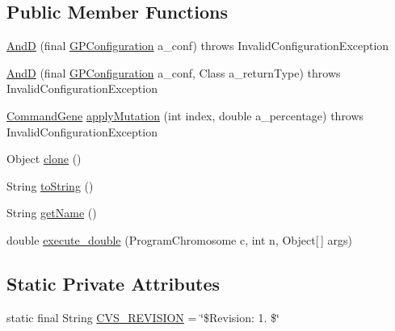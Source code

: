 \subsection*{Public Member Functions}
\begin{DoxyCompactItemize}
\item 
\hyperlink{classexamples_1_1gp_1_1symbolic_regression_1_1_and_d_af4cf82cb1c3ec38f1fb358be9f6c8a3c}{And\-D} (final \hyperlink{classorg_1_1jgap_1_1gp_1_1impl_1_1_g_p_configuration}{G\-P\-Configuration} a\-\_\-conf)  throws Invalid\-Configuration\-Exception 
\item 
\hyperlink{classexamples_1_1gp_1_1symbolic_regression_1_1_and_d_a543a918891473f525aac3e6ba2c5ce9f}{And\-D} (final \hyperlink{classorg_1_1jgap_1_1gp_1_1impl_1_1_g_p_configuration}{G\-P\-Configuration} a\-\_\-conf, Class a\-\_\-return\-Type)  throws Invalid\-Configuration\-Exception 
\item 
\hyperlink{classorg_1_1jgap_1_1gp_1_1_command_gene}{Command\-Gene} \hyperlink{classexamples_1_1gp_1_1symbolic_regression_1_1_and_d_abc123ebb5a86ea3479c39b254727a0cf}{apply\-Mutation} (int index, double a\-\_\-percentage)  throws Invalid\-Configuration\-Exception 
\item 
Object \hyperlink{classexamples_1_1gp_1_1symbolic_regression_1_1_and_d_a37a1d782d62692b545df3b76994b4ea0}{clone} ()
\item 
String \hyperlink{classexamples_1_1gp_1_1symbolic_regression_1_1_and_d_acccc0f44ff35846d116b383af0f9dd35}{to\-String} ()
\item 
String \hyperlink{classexamples_1_1gp_1_1symbolic_regression_1_1_and_d_adb607dda6e339988cf39fee9ee7810aa}{get\-Name} ()
\item 
double \hyperlink{classexamples_1_1gp_1_1symbolic_regression_1_1_and_d_aa0ef8797f4453c6fd356b12582a37b32}{execute\-\_\-double} (Program\-Chromosome c, int n, Object\mbox{[}$\,$\mbox{]} args)
\end{DoxyCompactItemize}
\subsection*{Static Private Attributes}
\begin{DoxyCompactItemize}
\item 
static final String \hyperlink{classexamples_1_1gp_1_1symbolic_regression_1_1_and_d_a61e634e6f7c270f29a94374572e35e70}{C\-V\-S\-\_\-\-R\-E\-V\-I\-S\-I\-O\-N} = \char`\"{}\$Revision\-: 1. \$\char`\"{}
\end{DoxyCompactItemize}


